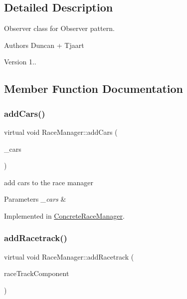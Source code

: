 \subsection{Detailed Description}
Observer class for Observer pattern. 

\begin{DoxyAuthor}{Authors}
Duncan + Tjaart 
\end{DoxyAuthor}
\begin{DoxyVersion}{Version}
1.. 
\end{DoxyVersion}


\subsection{Member Function Documentation}
\mbox{\label{class_race_manager_a96b19bc745ac837db71d71e3a2925ce8}} 
\subsubsection{\texorpdfstring{add\+Cars()}{addCars()}}
{\footnotesize\ttfamily virtual void Race\+Manager\+::add\+Cars (\begin{DoxyParamCaption}\item[{vector$<$ \mbox{\hyperlink{class_car}{Car}} $\ast$$>$}]{\+\_\+cars }\end{DoxyParamCaption})\hspace{0.3cm}{\ttfamily [pure virtual]}}

add cars to the race manager 
\begin{DoxyParams}{Parameters}
{\em \+\_\+cars} & \\
\hline
\end{DoxyParams}


Implemented in \mbox{\hyperlink{class_concrete_race_manager_af66dfe4faeefa1c5011cc6f64fec967e}{Concrete\+Race\+Manager}}.

\mbox{\label{class_race_manager_ae6dda6855a1f976bb46c2b53ad8f29a4}} 
\subsubsection{\texorpdfstring{add\+Racetrack()}{addRacetrack()}}
{\footnotesize\ttfamily virtual void Race\+Manager\+::add\+Racetrack (\begin{DoxyParamCaption}\item[{\mbox{\hyperlink{class_race_track_component}{Race\+Track\+Component}} $\ast$}]{race\+Track\+Component }\end{DoxyParamCaption})\hspace{0.3cm}{\ttfamily [pure virtual]}}

